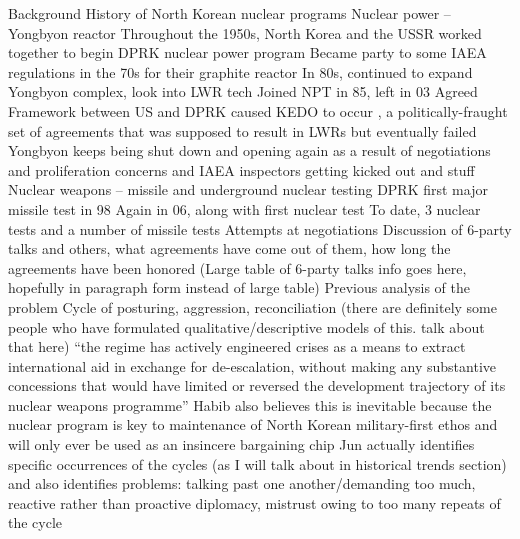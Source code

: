 \documentclass{article}
\begin{document}
\begin{outline}[enumerate]
\1 Background
    \2 History of North Korean nuclear programs 
        \3 Nuclear power – Yongbyon reactor
            \4 Throughout the 1950s, North Korea and the USSR worked together to begin DPRK nuclear power program \cite{nti15}
            \4 Became party to some IAEA regulations in the 70s for their graphite reactor \cite{iaea09}
            \4 In 80s, continued to expand Yongbyon complex, look into LWR tech  \cite{ntiYongbyon}
            \4 Joined NPT in 85, left in 03 \cite{npt}
            \4 Agreed Framework between US and DPRK caused KEDO to occur \cite{agreed, davenport}, a politically-fraught set of agreements that was supposed to result in LWRs but eventually failed
            \4 Yongbyon keeps being shut down and opening again as a result of negotiations and proliferation concerns and IAEA inspectors getting kicked out and stuff \cite{davenport,nti15, iaea09}
        \3 Nuclear weapons – missile and underground nuclear testing
            \4 DPRK first major missile test in 98 \cite{orfall}
            \4 Again in 06, along with first nuclear test \cite{davenport}
            \4 To date, 3 nuclear tests and a number of missile tests \cite{davenport, nti15}
    \2 Attempts at negotiations
        \3 Discussion of 6-party talks and others, what agreements have come out of them, how long the agreements have been honored
        \3 (Large table of 6-party talks info goes here, hopefully in paragraph form instead of large table)
        \3 \cite{6pt, js4, js5, js6}
    \2 Previous analysis of the problem
        \3 Cycle of posturing, aggression, reconciliation (there are definitely some people who have formulated qualitative/descriptive models of this. talk about that here)
            \4 “the regime has actively engineered crises as a means to extract international aid in exchange for de-escalation, without making any substantive concessions that would have limited or reversed the development trajectory of its nuclear weapons programme” \cite{habib}
            \4 Habib \cite{habib} also believes this is inevitable because the nuclear program is key to maintenance of North Korean military-first ethos and will only ever be used as an insincere bargaining chip
            \4 Jun \cite{jun} actually identifies specific occurrences of the cycles (as I will talk about in historical trends section) and also identifies problems: talking past one another/demanding too much, reactive rather than proactive diplomacy, mistrust owing to too many repeats of the cycle
            

\end{outline}
\end{document}
